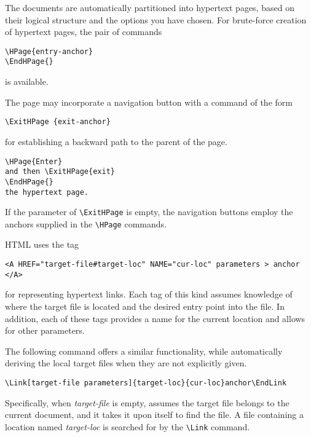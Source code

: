 
The documents are automatically partitioned into hypertext pages, based
on their logical structure and the options you have chosen. For
brute-force creation of hypertext pages, the pair of commands 

\begin{verbatim}
\HPage{entry-anchor} 
\EndHPage{} 
\end{verbatim}

is available. 

The page may incorporate a navigation button with a command of the form 

\begin{verbatim}
\ExitHPage {exit-anchor} 
\end{verbatim}

for establishing a backward path to the parent of the page. 
 
\begin{verbatim}
\HPage{Enter} 
and then \ExitHPage{exit} 
\EndHPage{} 
the hypertext page. 
\end{verbatim}

If the parameter of \verb|\ExitHPage| is empty, the navigation buttons
employ the anchors supplied in the \verb|\HPage| commands. 



HTML uses the tag 

\begin{verbatim}
<A HREF="target-file#target-loc" NAME="cur-loc" parameters > anchor </A> 
\end{verbatim}

for representing hypertext links. Each tag of this kind 
assumes knowledge of where the target file is located and the desired entry point 
into the file. In addition, each of these tags provides a name for the current location 
and allows for other parameters. 

The following command offers a similar functionality, while automatically
deriving the local target files when they are not explicitly given. 

\begin{verbatim}
\Link[target-file parameters]{target-loc}{cur-loc}anchor\EndLink 
\end{verbatim}

Specifically, when \emph{target-file} is empty, \texht assumes the target file
belongs to the current document, and it takes it upon itself to find the file.
A file containing a location named \emph{target-loc} is searched for by the
\verb|\Link| command. 

